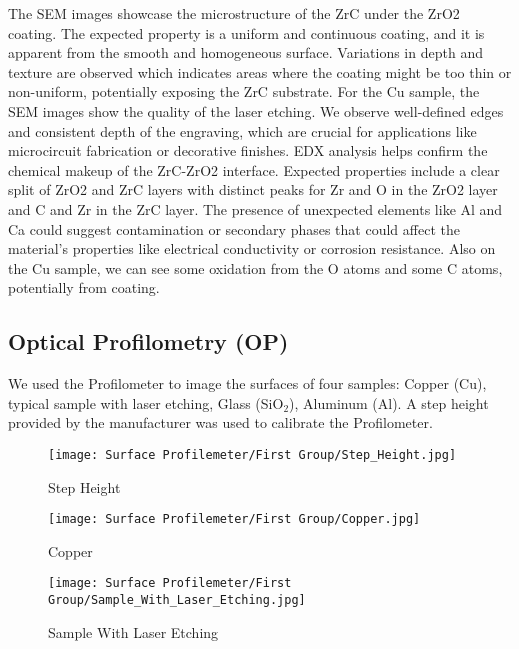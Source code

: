 \documentclass[11pt]{article}
\begin{document}
	The SEM images showcase the microstructure of the ZrC under the ZrO2 coating. The expected property is a uniform and continuous coating, and it is apparent from the smooth and homogeneous surface. Variations in depth and texture are observed which indicates areas where the coating might be too thin or non-uniform, potentially exposing the ZrC substrate. For the Cu sample, the SEM images show the quality of the laser etching. We observe well-defined edges and consistent depth of the engraving, which are crucial for applications like microcircuit fabrication or decorative finishes.
	EDX analysis helps confirm the chemical makeup of the ZrC-ZrO2 interface. Expected properties include a clear split of ZrO2 and ZrC layers with distinct peaks for Zr and O in the ZrO2 layer and C and Zr in the ZrC layer. The presence of unexpected elements like Al and Ca could suggest contamination or secondary phases that could affect the material's properties like electrical conductivity or corrosion resistance. Also on the Cu sample, we can see some oxidation from the O atoms and some C atoms, potentially from coating.
	
\clearpage

	\subsection{Optical Profilometry (OP)}
	
	We used the Profilometer to image the surfaces of four samples: Copper (Cu), typical sample with laser etching, Glass (SiO$_2$), Aluminum (Al). A step height provided by the manufacturer was used to calibrate the Profilometer.
	
	\begin{figure}[htbp]
		\centering
		\texttt{[image: Surface Profilemeter/First Group/Step\_Height.jpg]}
		\caption{Step Height}
		\label{fig:OP_Step_Height}
	\end{figure}
	
	\begin{figure}[htbp]
		\centering
		\texttt{[image: Surface Profilemeter/First Group/Copper.jpg]}
		\caption{Copper}
		\label{fig:OP_Copper}
	\end{figure}
	
	\begin{figure}[htbp]
		\centering
		\texttt{[image: Surface Profilemeter/First Group/Sample\_With\_Laser\_Etching.jpg]}
		\caption{Sample With Laser Etching}
		\label{fig:OP_Sample_With_Laser_Etching}
	\end{figure}
	
\end{document}
